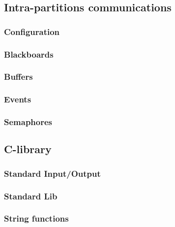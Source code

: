    \subsection{Intra-partitions communications}
      \subsubsection{Configuration}

      \subsubsection{Blackboards}
      

      \subsubsection{Buffers}
      


      \subsubsection{Events}
      

      \subsubsection{Semaphores}
      

   \subsection{C-library}

      \subsubsection{Standard Input/Output}
      

      \subsubsection{Standard Lib}
      

      \subsubsection{String functions}
      


